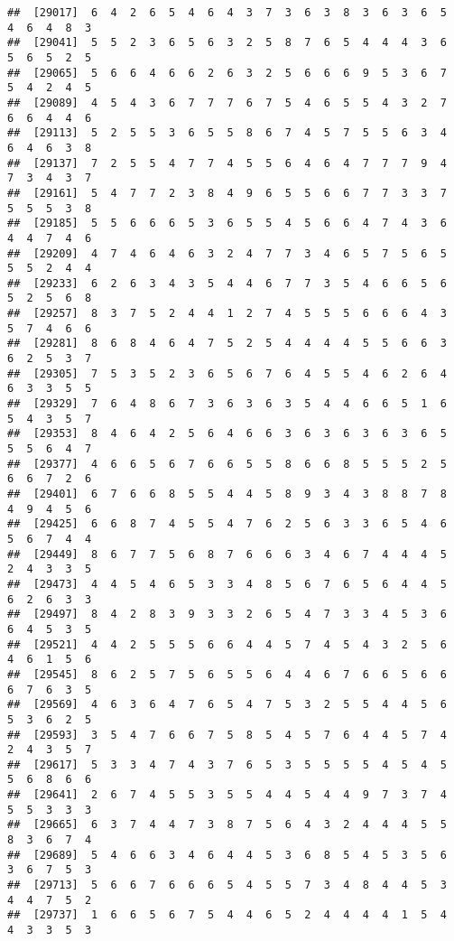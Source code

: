 \documentclass[
]{book}
\begin{document}
\begin{verbatim}
##  [29017]  6  4  2  6  5  4  6  4  3  7  3  6  3  8  3  6  3  6  5  4  6  4  8  3
##  [29041]  5  5  2  3  6  5  6  3  2  5  8  7  6  5  4  4  4  3  6  5  6  5  2  5
##  [29065]  5  6  6  4  6  6  2  6  3  2  5  6  6  6  9  5  3  6  7  5  4  2  4  5
##  [29089]  4  5  4  3  6  7  7  7  6  7  5  4  6  5  5  4  3  2  7  6  6  4  4  6
##  [29113]  5  2  5  5  3  6  5  5  8  6  7  4  5  7  5  5  6  3  4  6  4  6  3  8
##  [29137]  7  2  5  5  4  7  7  4  5  5  6  4  6  4  7  7  7  9  4  7  3  4  3  7
##  [29161]  5  4  7  7  2  3  8  4  9  6  5  5  6  6  7  7  3  3  7  5  5  5  3  8
##  [29185]  5  5  6  6  6  5  3  6  5  5  4  5  6  6  4  7  4  3  6  4  4  7  4  6
##  [29209]  4  7  4  6  4  6  3  2  4  7  7  3  4  6  5  7  5  6  5  5  5  2  4  4
##  [29233]  6  2  6  3  4  3  5  4  4  6  7  7  3  5  4  6  6  5  6  5  2  5  6  8
##  [29257]  8  3  7  5  2  4  4  1  2  7  4  5  5  5  6  6  6  4  3  5  7  4  6  6
##  [29281]  8  6  8  4  6  4  7  5  2  5  4  4  4  4  5  5  6  6  3  6  2  5  3  7
##  [29305]  7  5  3  5  2  3  6  5  6  7  6  4  5  5  4  6  2  6  4  6  3  3  5  5
##  [29329]  7  6  4  8  6  7  3  6  3  6  3  5  4  4  6  6  5  1  6  5  4  3  5  7
##  [29353]  8  4  6  4  2  5  6  4  6  6  3  6  3  6  3  6  3  6  5  5  5  6  4  7
##  [29377]  4  6  6  5  6  7  6  6  5  5  8  6  6  8  5  5  5  2  5  6  6  7  2  6
##  [29401]  6  7  6  6  8  5  5  4  4  5  8  9  3  4  3  8  8  7  8  4  9  4  5  6
##  [29425]  6  6  8  7  4  5  5  4  7  6  2  5  6  3  3  6  5  4  6  5  6  7  4  4
##  [29449]  8  6  7  7  5  6  8  7  6  6  6  3  4  6  7  4  4  4  5  2  4  3  3  5
##  [29473]  4  4  5  4  6  5  3  3  4  8  5  6  7  6  5  6  4  4  5  6  2  6  3  3
##  [29497]  8  4  2  8  3  9  3  3  2  6  5  4  7  3  3  4  5  3  6  6  4  5  3  5
##  [29521]  4  4  2  5  5  5  6  6  4  4  5  7  4  5  4  3  2  5  6  4  6  1  5  6
##  [29545]  8  6  2  5  7  5  6  5  5  6  4  4  6  7  6  6  5  6  6  6  7  6  3  5
##  [29569]  4  6  3  6  4  7  6  5  4  7  5  3  2  5  5  4  4  5  6  5  3  6  2  5
##  [29593]  3  5  4  7  6  6  7  5  8  5  4  5  7  6  4  4  5  7  4  2  4  3  5  7
##  [29617]  5  3  3  4  7  4  3  7  6  5  3  5  5  5  5  4  5  4  5  5  6  8  6  6
##  [29641]  2  6  7  4  5  5  3  5  5  4  4  5  4  4  9  7  3  7  4  5  5  3  3  3
##  [29665]  6  3  7  4  4  7  3  8  7  5  6  4  3  2  4  4  4  5  5  8  3  6  7  4
##  [29689]  5  4  6  6  3  4  6  4  4  5  3  6  8  5  4  5  3  5  6  3  6  7  5  3
##  [29713]  5  6  6  7  6  6  6  5  4  5  5  7  3  4  8  4  4  5  3  4  4  7  5  2
##  [29737]  1  6  6  5  6  7  5  4  4  6  5  2  4  4  4  4  1  5  4  4  3  3  5  3

\end{verbatim}
\end{document}
